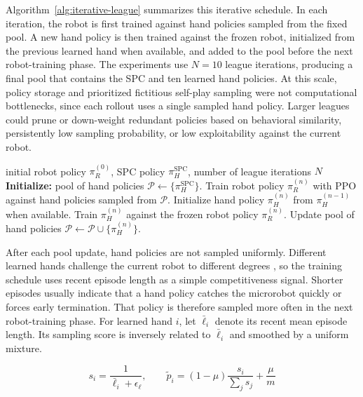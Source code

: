 \documentclass[lettersize,journal]{IEEEtran}
\begin{document}
Algorithm~\ref{alg:iterative-league} summarizes this iterative schedule. In each iteration, the robot is first trained against hand policies sampled from the fixed pool. A new hand policy is then trained against the frozen robot, initialized from the previous learned hand when available, and added to the pool before the next robot-training phase. The experiments use $N=10$ league iterations, producing a final pool that contains the SPC and ten learned hand policies. At this scale, policy storage and prioritized fictitious self-play sampling were not computational bottlenecks, since each rollout uses a single sampled hand policy. Larger leagues could prune or down-weight redundant policies based on behavioral similarity, persistently low sampling probability, or low exploitability against the current robot.

\begin{algorithm}[!t]
\caption{Iterative League Training}
\label{alg:iterative-league}
\footnotesize
\begin{algorithmic}[1]
\Require initial robot policy $\pi_R^{(0)}$, SPC policy $\pi_H^{\mathrm{SPC}}$, number of league iterations $N$
\Statex \textbf{Initialize:} pool of hand policies $\mathcal{P}\leftarrow\{\pi_H^{\mathrm{SPC}}\}$.
  \State Train robot policy $\pi_R^{(n)}$ with PPO against hand policies
  \Statex \hspace{\algorithmicindent} sampled from $\mathcal{P}$.
  \State Initialize hand policy $\pi_H^{(n)}$ from $\pi_H^{(n-1)}$ when available.
  \State Train $\pi_H^{(n)}$ against the frozen robot policy $\pi_R^{(n)}$.
  \State Update pool of hand policies $\mathcal{P}\leftarrow\mathcal{P}\cup\{\pi_H^{(n)}\}$.
\EndFor
\end{algorithmic}
\end{algorithm}

After each pool update, hand policies are not sampled uniformly. Different learned hands challenge the current robot to different degrees \cite{huangOpponentAwareLeague2023}, so the training schedule uses recent episode length as a simple competitiveness signal. Shorter episodes usually indicate that a hand policy catches the microrobot quickly or forces early termination. That policy is therefore sampled more often in the next robot-training phase. For learned hand $i$, let $\bar{\ell}_i$ denote its recent mean episode length. Its sampling score is inversely related to $\bar{\ell}_i$ and smoothed by a uniform mixture.

\begin{equation}
s_i = \frac{1}{\bar{\ell}_i+\epsilon_{\ell}},
\qquad
\widetilde{p}_i = (1-\mu)\frac{s_i}{\sum_j s_j}+\frac{\mu}{m}
\label{eq:opponent-sampling}
\end{equation}
\end{document}
